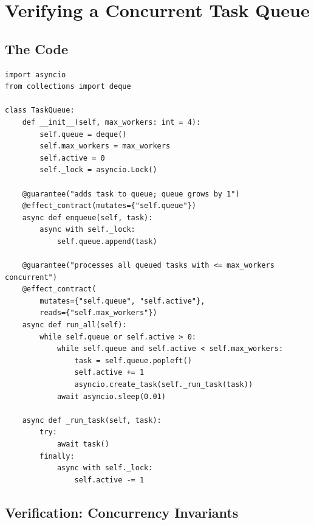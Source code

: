 \documentclass[11pt,a4paper]{report}
\theoremstyle{definition}
\theoremstyle{plain}
\begin{document}
\chapter{Verifying a Concurrent Task Queue}
\label{ch:case-queue}

\section{The Code}

\begin{lstlisting}[style=synhopy]
import asyncio
from collections import deque

class TaskQueue:
    def __init__(self, max_workers: int = 4):
        self.queue = deque()
        self.max_workers = max_workers
        self.active = 0
        self._lock = asyncio.Lock()

    @guarantee("adds task to queue; queue grows by 1")
    @effect_contract(mutates={"self.queue"})
    async def enqueue(self, task):
        async with self._lock:
            self.queue.append(task)

    @guarantee("processes all queued tasks with <= max_workers concurrent")
    @effect_contract(
        mutates={"self.queue", "self.active"},
        reads={"self.max_workers"})
    async def run_all(self):
        while self.queue or self.active > 0:
            while self.queue and self.active < self.max_workers:
                task = self.queue.popleft()
                self.active += 1
                asyncio.create_task(self._run_task(task))
            await asyncio.sleep(0.01)

    async def _run_task(self, task):
        try:
            await task()
        finally:
            async with self._lock:
                self.active -= 1
\end{lstlisting}

\section{Verification: Concurrency Invariants}
\end{document}
